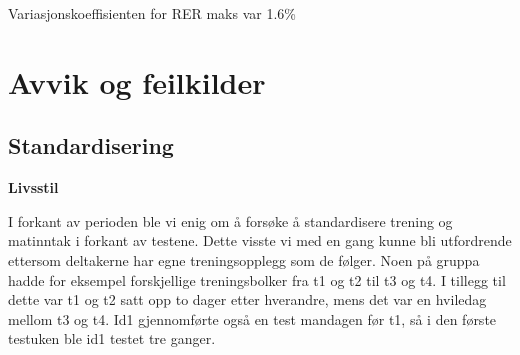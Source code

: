 \documentclass[
  letterpaper,
  DIV=11,
  numbers=noendperiod]{scrreprt}
\newenvironment{Shaded}{\begin{snugshade}}{\end{snugshade}}
\newcommand{\AttributeTok}[1]{\textcolor[rgb]{0.40,0.45,0.13}{#1}}
\newcommand{\CommentTok}[1]{\textcolor[rgb]{0.37,0.37,0.37}{#1}}
\newcommand{\ConstantTok}[1]{\textcolor[rgb]{0.56,0.35,0.01}{#1}}
\newcommand{\DecValTok}[1]{\textcolor[rgb]{0.68,0.00,0.00}{#1}}
\newcommand{\FunctionTok}[1]{\textcolor[rgb]{0.28,0.35,0.67}{#1}}
\newcommand{\NormalTok}[1]{\textcolor[rgb]{0.00,0.23,0.31}{#1}}
\newcommand{\OtherTok}[1]{\textcolor[rgb]{0.00,0.23,0.31}{#1}}
\newcommand{\SpecialCharTok}[1]{\textcolor[rgb]{0.37,0.37,0.37}{#1}}
\begin{document}
\begin{Shaded}
\end{Shaded}

Variasjonskoeffisienten for RER maks var 1.6\%


\chapter{Avvik og feilkilder}\label{avvik-og-feilkilder}

\section{Standardisering}\label{standardisering-1}

\textbf{Livsstil}

I forkant av perioden ble vi enig om å forsøke å standardisere trening
og matinntak i forkant av testene. Dette visste vi med en gang kunne bli
utfordrende ettersom deltakerne har egne treningsopplegg som de følger.
Noen på gruppa hadde for eksempel forskjellige treningsbolker fra t1 og
t2 til t3 og t4. I tillegg til dette var t1 og t2 satt opp to dager
etter hverandre, mens det var en hviledag mellom t3 og t4. Id1
gjennomførte også en test mandagen før t1, så i den første testuken ble
id1 testet tre ganger.
\end{document}
